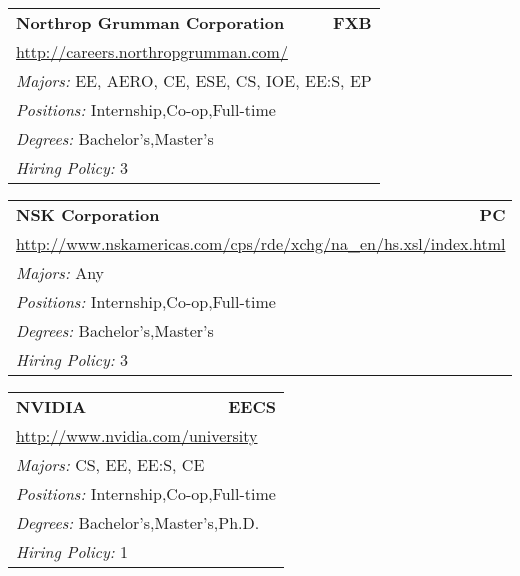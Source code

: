 \documentclass[twoside]{article}
\begin{document}
\begin{center}
\begin{multicols}{3}
\begin{FlushLeft}
\begin{minipage}{\columnwidth}
\end{minipage}
 
\begin{minipage}{\columnwidth}\begin{tabularx}{.95\columnwidth}{Xr}
                 {\Large\bf Northrop Grumman Corporation} & {\Large\bf FXB}\\
    \multicolumn{2}{p{.95\columnwidth}}{\url{http://careers.northropgrumman.com/}}\\
    \multicolumn{2}{p{.95\columnwidth}}{\emph{Majors:} EE, AERO, CE, ESE, CS, IOE, EE:S, EP}\\
    \multicolumn{2}{p{.95\columnwidth}}{\emph{Positions:} Internship,Co-op,Full-time}\\
    \multicolumn{2}{p{.95\columnwidth}}{\emph{Degrees:} Bachelor's,Master's}\\
    \multicolumn{2}{p{.95\columnwidth}}{\emph{Hiring Policy:} 3}\\
    \end{tabularx}
    
\end{minipage}
 
\begin{minipage}{\columnwidth}\begin{tabularx}{.95\columnwidth}{Xr}
                 {\Large\bf NSK Corporation} & {\Large\bf PC}\\
    \multicolumn{2}{p{.95\columnwidth}}{\url{http://www.nskamericas.com/cps/rde/xchg/na_en/hs.xsl/index.html}}\\
    \multicolumn{2}{p{.95\columnwidth}}{\emph{Majors:} Any}\\
    \multicolumn{2}{p{.95\columnwidth}}{\emph{Positions:} Internship,Co-op,Full-time}\\
    \multicolumn{2}{p{.95\columnwidth}}{\emph{Degrees:} Bachelor's,Master's}\\
    \multicolumn{2}{p{.95\columnwidth}}{\emph{Hiring Policy:} 3}\\
    \end{tabularx}
    
\end{minipage}
 
\begin{minipage}{\columnwidth}\begin{tabularx}{.95\columnwidth}{Xr}
                 {\Large\bf NVIDIA} & {\Large\bf EECS}\\
    \multicolumn{2}{p{.95\columnwidth}}{\url{http://www.nvidia.com/university}}\\
    \multicolumn{2}{p{.95\columnwidth}}{\emph{Majors:} CS, EE, EE:S, CE}\\
    \multicolumn{2}{p{.95\columnwidth}}{\emph{Positions:} Internship,Co-op,Full-time}\\
    \multicolumn{2}{p{.95\columnwidth}}{\emph{Degrees:} Bachelor's,Master's,Ph.D.}\\
    \multicolumn{2}{p{.95\columnwidth}}{\emph{Hiring Policy:} 1}\\
    \end{tabularx}
    

\end{minipage}
\end{FlushLeft}
\end{multicols}
\end{center}
\end{document}
